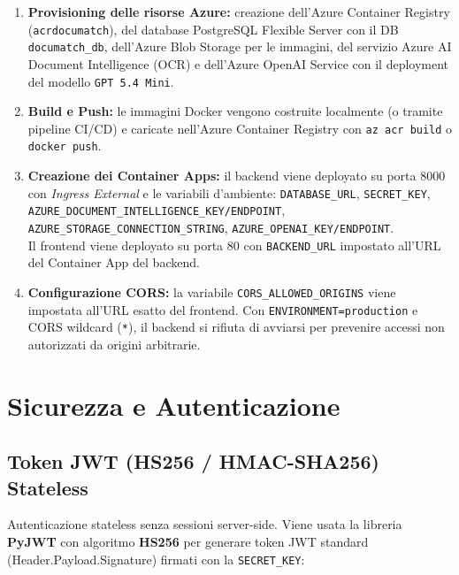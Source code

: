 \documentclass[12pt,a4paper,oneside]{report}
\begin{document}
\begin{enumerate}
    \item \textbf{Provisioning delle risorse Azure:} creazione dell'Azure Container Registry
          (\texttt{acrdocumatch}), del database PostgreSQL Flexible Server con il DB
          \texttt{documatch\_db}, dell'Azure Blob Storage per le immagini, del servizio
          Azure AI Document Intelligence (OCR) e dell'Azure OpenAI Service con il
          deployment del modello \texttt{GPT 5.4 Mini}.
    \item \textbf{Build e Push:} le immagini Docker vengono costruite localmente
          (o tramite pipeline CI/CD) e caricate nell'Azure Container Registry
          con \texttt{az acr build} o \texttt{docker push}.
    \item \textbf{Creazione dei Container Apps:} il backend viene deployato su porta
          8000 con \textit{Ingress External} e le variabili d'ambiente:
          \texttt{DATABASE\_URL}, \texttt{SECRET\_KEY},
          \texttt{AZURE\_DOCUMENT\_INTELLIGENCE\_KEY/ENDPOINT},
          \texttt{AZURE\_STORAGE\_CONNECTION\_STRING},
          \texttt{AZURE\_OPENAI\_KEY/ENDPOINT}. \\
          Il frontend viene deployato su porta 80 con \texttt{BACKEND\_URL} impostato
          all'URL del Container App del backend.
    \item \textbf{Configurazione CORS:} la variabile \texttt{CORS\_ALLOWED\_ORIGINS}
          viene impostata all'URL esatto del frontend. Con \texttt{ENVIRONMENT=production}
          e CORS wildcard (\texttt{*}), il backend si rifiuta di avviarsi per prevenire
          accessi non autorizzati da origini arbitrarie.
\end{enumerate}

\chapter{Sicurezza e Autenticazione}

\section{Token JWT (HS256 / HMAC-SHA256) Stateless}

Autenticazione stateless senza sessioni server-side. Viene usata la libreria
\textbf{PyJWT} con algoritmo \textbf{HS256} per generare token JWT standard
(Header.Payload.Signature) firmati con la \texttt{SECRET\_KEY}:
\end{document}
